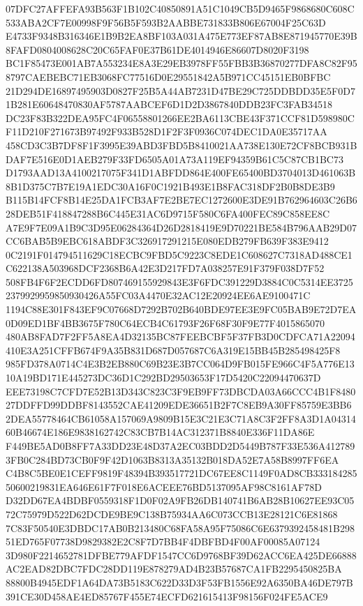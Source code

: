 \documentclass[UTF8,fontset=fandol,zihao=-4,a4paper]{ctexart}
\begin{document}
{{07DFC27AFFEFA93B563F1B102C40850891A51C1049CB5D9465F9868680C608C533ABA2CF7E00998F9F56B5F593B2AABBE731833B806E67004F25C63D
E4733F9348B316346E1B9B2EA8BF103A031A475E773EF87AB8E871945770E39B8FAFD0804008628C20C65FAF0E37B61DE4014946E86607D8020F3198
BC1F85473E001AB7A553234E8A3E29EB3978FF55FBB3B36870277DFA8C82F958797CAEBEBC71EB3068FC77516D0E29551842A5B971CC45151EB0BFBC
21D294DE16897495903D0827F25B5A44AB7231D47BE29C725DDBDD35E5F0D71B281E60648470830AF5787AABCEF6D1D2D3867840DDB23FC3FAB34518
DC23F83B322DEA95FC4F06558801266EE2BA6113CBE43F371CCF81D598980CF11D210F271673B97492F933B528D1F2F3F0936C074DEC1DA0E35717AA
458CD3C3B7DF8F1F3995E39ABD3FBD5B8410021AA738E130E72CF8BCB931BDAF7E516E0D1AEB279F33FD6505A01A73A119EF94359B61C5C87CB1BC73
D1793AAD13A4100217075F341D1ABFDD864E400FE65400BD3704013D461063B8B1D375C7B7E19A1EDC30A16F0C1921B493E1B8FAC318DF2B0B8DE3B9
B115B14FCF8B14E25DA1FCB3AF7E2BE7EC1272600E3DE91B762964603C26B628DEB51F418847288B6C445E31AC6D9715F580C6FA400FEC89C858EE8C
A7E9F7E09A1B9C3D95E06284364D26D2818419E9D70221BE584B796AAB29D07CC6BAB5B9EBC618ABDF3C326917291215E080EDB279FB639F383E9412
0C2191F014794511629C18ECBC9FBD5C9223C8EDE1C608627C7318AD488CE1C622138A503968DCF2368B6A42E3D217FD7A038257E91F379F038D7F52
508FB4F6F2ECDD6FD807469155929843E3F6FDC391229D3884C0C5314EE37252379929959850930426A55FC03A4470E32AC12E20924EE6AE9100471C
1194C88E301F843EF9C07668D7292B702B640BDE97EE3E9FC05BAB9E72D7EA0D09ED1BF4BB3675F780C64ECB4C61793F26F68F30F9E77F4015865070
480AB8FAD7F2FF5A8EA4D32135BC87FEEBCBF5F37FB3D0CDFCA71A22094410E3A251CFFB674F9A35B831D687D057687C6A319E15BB45B285498425F8
985FD378A0714C4E3B2EB880C69B23E3B7CC064D9FB015FE966C4F5A776E1310A19BD171E445273DC36D1C292BD29503653F17D5420C22094470637D
EEE73198C7CFD7E52B13D343C823C3F9EB9FF73DBCDA03A66CCC4B1F848027DDFFD99DDBF8143552CAE41209EDE36651B2F7C8EB9A30FF85759E3BB6
2DEA55778464CB61058A157069A9809B15E3C21E3C71A8C3F2FF8A3D1A0431460B46674E186E9838162742C83CB7B14AC312371B8840E336F11DA86E
F449BE5AD0B8FF7A33DD23E48D37A2EC03BDD2D5449B787F33E536A4127893FB0C284BD73CB0F9F42D1063B8313A35132B018DA52E7A58B8997FF6EA
C4B8C5BE0E1CEFF9819F48394B393517721DC67EE8C1149F0AD8CB33318428550600219831EA646E61F7F018E6ACEEE76BD5137095AF98C8161AF78D
D32DD67EA4BDBF0559318F1D0F02A9FB26DB140741B6AB28B10627EE93C0572C75979D522D62DCDE9BE9C138B75934AA6C073CCB13E28121C6E81868
7C83F50540E3DBDC17AB0B213480C68FA58A95F75086C6E6379392458481B29851ED765F07738D9829382E2C8F7D7BB4F4DBFBD4F00AF00085A07124
3D980F2214652781DFBE779AFDF1547CC6D9768BF39D62ACC6EA425DE66888AC2EAD82DBC7FDC28DD119E878279AD4B23B57687CA1FB2295450825BA
88800B4945EDF1A64DA73B5183C622D33D3F53FB1556E92A6350BA46DE797B391CE30D458AE4ED85767F455E74ECFD621615413F98156F024FE5ACE9
}}
\end{document}
